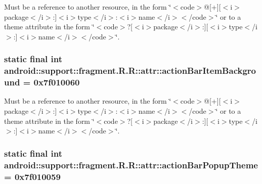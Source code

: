 Must be a reference to another resource, in the form \char`\"{}$<$code$>$@\mbox{[}+\mbox{]}\mbox{[}$<$i$>$package$<$/i$>$:\mbox{]}$<$i$>$type$<$/i$>$:$<$i$>$name$<$/i$>$$<$/code$>$\char`\"{} or to a theme attribute in the form \char`\"{}$<$code$>$?\mbox{[}$<$i$>$package$<$/i$>$:\mbox{]}\mbox{[}$<$i$>$type$<$/i$>$:\mbox{]}$<$i$>$name$<$/i$>$$<$/code$>$\char`\"{}. \hypertarget{classandroid_1_1support_1_1fragment_1_1_r_1_1attr_13859be2320dd3ad38b0c379caa84da2}{
\subsubsection[{actionBarItemBackground}]{\setlength{\rightskip}{0pt plus 5cm}static final int android::support::fragment.R.R::attr::actionBarItemBackground = 0x7f010060}}
\label{classandroid_1_1support_1_1fragment_1_1_r_1_1attr_13859be2320dd3ad38b0c379caa84da2}


Must be a reference to another resource, in the form \char`\"{}$<$code$>$@\mbox{[}+\mbox{]}\mbox{[}$<$i$>$package$<$/i$>$:\mbox{]}$<$i$>$type$<$/i$>$:$<$i$>$name$<$/i$>$$<$/code$>$\char`\"{} or to a theme attribute in the form \char`\"{}$<$code$>$?\mbox{[}$<$i$>$package$<$/i$>$:\mbox{]}\mbox{[}$<$i$>$type$<$/i$>$:\mbox{]}$<$i$>$name$<$/i$>$$<$/code$>$\char`\"{}. \hypertarget{classandroid_1_1support_1_1fragment_1_1_r_1_1attr_3cb45d51c6e54775184a0568d53556b0}{
\subsubsection[{actionBarPopupTheme}]{\setlength{\rightskip}{0pt plus 5cm}static final int android::support::fragment.R.R::attr::actionBarPopupTheme = 0x7f010059}}
\label{classandroid_1_1support_1_1fragment_1_1_r_1_1attr_3cb45d51c6e54775184a0568d53556b0}


